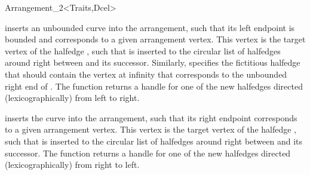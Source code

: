 \begin{ccRefClass}{Arrangement_2<Traits,Dcel>}
\begin{ccAdvanced}
  {inserts an unbounded curve  into the arrangement, such that its left
   endpoint is bounded and corresponds to a given arrangement vertex. This
   vertex is the target vertex of the halfedge , such that 
   is inserted to the circular list of halfedges around 
   right between  and its successor. Similarly, 
   specifies the fictitious halfedge that should contain the vertex at infinity
   that corresponds to the unbounded right end of .
   The function returns a handle for one of the new halfedges directed
   (lexicographically) from left to right.
   }

  {inserts the curve  into the arrangement, such that its right
   endpoint corresponds to a given arrangement vertex. This vertex is the
   target vertex of the halfedge , such that  is inserted
   to the circular list of halfedges around  right
   between  and its successor. The function returns a handle for
   one of the new halfedges directed (lexicographically) from right to left.
   }


\end{ccAdvanced}
\end{ccRefClass}
